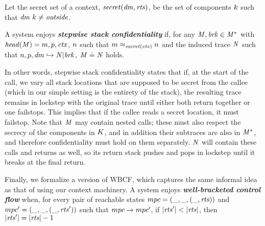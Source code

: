 \documentclass[acmsmall,review,anonymous]{acmart}\settopmatter{printfolios=true,printccs=false,printacmref=false}
\begin{document}
{
Let the secret set of a context, \(\mathit{secret}(\mathit{dm},\mathit{rts})\), be the
set of components \(k\) such that \(\mathit{dm} ~ k \not = \mathit{outside}\).

A system enjoys \textbf{\textit{stepwise stack confidentiality}} if,
for any \(\mathit{M},\mathit{brk} \in \mathit{M}^*\) with \(\mathit{head}(\mathit{M}) = m,p,\mathit{ctx}\),
\(n\) such that \(m \approx_{\mathit{secret}(\mathit{ctx})} n\) and the induced trace
\(\mathit{N}\) such that \(n,p,\mathit{dm} \hookrightarrow \mathit{N} | \mathit{brk}\),
\(\mathit{M} \doteq \mathit{N}\) holds.


In other words, stepwise stack confidentiality states that if, at the start of the call,
we vary all stack locations that are supposed to be secret from the callee
(which in our simple setting is the entirety of the stack),
the resulting trace remains in lockstep with the original trace
until either both return together or one failstops. This implies that
if the callee reads a secret location, it must failstop.%
%
Note that \(\mathit{M}\) may contain nested calls; these must also respect the secrecy
of the components in \(K\), and in addition their subtraces are also in
\(\mathit{M}^*\), and therefore confidentiality must hold on them separately. \(\mathit{N}\)
will contain these calls and returns as well, so its return stack pushes and pops
in lockstep until it breaks at the final return.

Finally, we formalize a version of WBCF, which captures the same informal idea
as that of \citet{SkorstengaardSTK} using our context machinery.
A system enjoys \textit{\textbf{well-bracketed control flow}} when, for every pair of reachable states
\(mpc = (\mbox{\_},\mbox{\_},(\mbox{\_},\mathit{rts}))\) and
\(mpc' = (\mbox{\_},\mbox{\_},(\mbox{\_},\mathit{rts}'))\) such that
\(mpc \xrightarrow{} mpc'\), if \(|\mathit{rts}'| < |\mathit{rts}|\), then
\(|\mathit{rts}'| = |\mathit{rts}|-1\)



}
\end{document}

